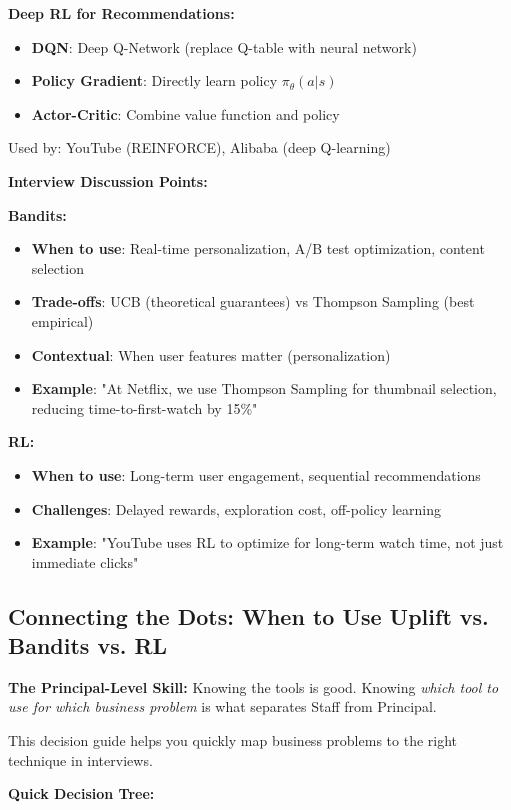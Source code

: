 \documentclass[10pt]{article}
\begin{document}
\textbf{Deep RL for Recommendations:}
\begin{itemize}
\item \textbf{DQN}: Deep Q-Network (replace Q-table with neural network)
\item \textbf{Policy Gradient}: Directly learn policy $\pi_\theta(a|s)$
\item \textbf{Actor-Critic}: Combine value function and policy
\end{itemize}

Used by: YouTube (REINFORCE), Alibaba (deep Q-learning)

\textbf{Interview Discussion Points:}

\textbf{Bandits:}
\begin{itemize}
\item \textbf{When to use}: Real-time personalization, A/B test optimization, content selection
\item \textbf{Trade-offs}: UCB (theoretical guarantees) vs Thompson Sampling (best empirical)
\item \textbf{Contextual}: When user features matter (personalization)
\item \textbf{Example}: "At Netflix, we use Thompson Sampling for thumbnail selection, reducing time-to-first-watch by 15\%"
\end{itemize}

\textbf{RL:}
\begin{itemize}
\item \textbf{When to use}: Long-term user engagement, sequential recommendations
\item \textbf{Challenges}: Delayed rewards, exploration cost, off-policy learning
\item \textbf{Example}: "YouTube uses RL to optimize for long-term watch time, not just immediate clicks"
\end{itemize}

\subsection{Connecting the Dots: When to Use Uplift vs. Bandits vs. RL}

\textbf{The Principal-Level Skill:} Knowing the tools is good. Knowing \textit{which tool to use for which business problem} is what separates Staff from Principal.

This decision guide helps you quickly map business problems to the right technique in interviews.

\textbf{Quick Decision Tree:}
\end{document}
